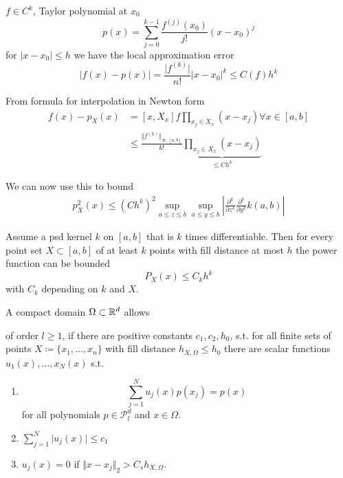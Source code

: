 $f\in C^k$, Taylor polynomial at $x_0$
\[p(x)=\sum_{j=0}^{k-1}\frac{f^{(j)}(x_0)}{j!}(x-x_0)^j\]
for $|x-x_0|\leq h$ we have the local approximation error 
\[|f(x)-p(x)|=\frac{\vert f^{(k)}\vert}{n!}|x-x_0|^k\leq C(f)h^k\]

From formula for interpolation in Newton form 
\begin{align*}
    f(x)-p_{X}(x)&={[x,X_x]f} \prod_{x_j\in X_x} (x-x_j)\forall x\in [a,b]\\
    &\leq \frac{\Vert f^{(k)}\Vert_{\infty,[a,b]}}{k!}\underbrace{\prod_{x_j\in X_x} (x-x_j)}_{\leq C h^k}
\end{align*}


We can now use this to bound 
\begin{align*}
    p_X^2(x)\leq (Ch^k)^2\sup_{a\leq z\leq b}\sup_{a\leq y\leq b}\left\vert \frac{\partial^k}{\partial z^k}\frac{\partial^k}{\partial y^k}k(a,b)  \right\vert %
\end{align*}

\begin{theorem}\label{thm:29}
    Assume a psd kernel $k$ on $[a,b]$ that is $k$ times differentiable. Then 
    for every point set $X\subset [a,b]$ of at least $k$ points with 
    fill distance at most $h$ the power function can be bounded 
    \begin{equation}
        P_X(x)\leq C_k h^k
    \end{equation}
    with $C_k$ depending on $k$ and $X$. 
\end{theorem}

\begin{definition}\label{def:30}
A compact domain $\Omega\subset\mathbb{R}^d$ allows

of order $l\geq 1$, if there are positive constants $c_1,c_2,h_0$, s.t. 
for all finite sets of points $X\coloneqq \{x_1,\dots,x_n\}$ with fill distance 
$h_{X,\Omega}\leq h_0$ there are scalar functions $u_1(x),\dots,x_N(x)$ s.t. 
\begin{enumerate}
    \item \[\sum_{j=1}^{N} u_j(x)p(x_j)=p(x)\] for all polynomials $p\in \mathcal{P}_l^d$ and $x\in\Omega$.   
    \item $\sum_{j=1}^N \vert u_j(x)\vert\leq c_1$
    \item $u_j(x)=0$ if $\Vert x- x_j\Vert_2>C_s h_{X,\Omega}$.
\end{enumerate} 
\end{definition}

